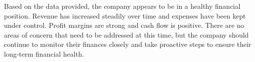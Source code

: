 

Based on the data provided, the company appears to be in a healthy financial position. Revenue has increased steadily over time and expenses have been kept under control. Profit margins are strong and cash flow is positive. There are no areas of concern that need to be addressed at this time, but the company should continue to monitor their finances closely and take proactive steps to ensure their long-term financial health.